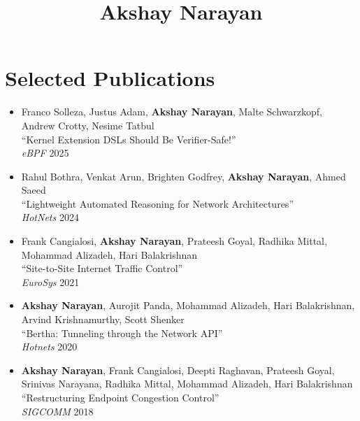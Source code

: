 \documentclass{article}
\newcommand{\preDoc}{}
\newcommand{\postDoc}{}
\newcommand{\titleAndEmptyVersionAndEmptyAuthors}[3]{\title{#1}\maketitle}
\newcommand{\identity}[1]{#1}
\begin{document}
\preDoc
\date{}
\titleAndEmptyVersionAndEmptyAuthors{Akshay Narayan}{}{}
\label{t:x28part_x22Akshayx5fNarayanx22x29}



\identity{\section{Selected Publications}}

\identity{\begin{itemize}[leftmargin=1cm]}
\identity{\item}Franco Solleza, Justus Adam, \identity{\textbf{Akshay Narayan}}, Malte Schwarzkopf, Andrew Crotty, Nesime Tatbul\identity{\\}{``}Kernel Extension DSLs Should Be Verifier{-}Safe!{''}\identity{\\}\identity{\emph{eBPF}}\identity{ }\identity{2025}\identity{\item}Rahul Bothra, Venkat Arun, Brighten Godfrey, \identity{\textbf{Akshay Narayan}}, Ahmed Saeed\identity{\\}{``}Lightweight Automated Reasoning for Network Architectures{''}\identity{\\}\identity{\emph{HotNets}}\identity{ }\identity{2024}\identity{\item}Frank Cangialosi, \identity{\textbf{Akshay Narayan}}, Prateesh Goyal, Radhika Mittal, Mohammad Alizadeh, Hari Balakrishnan\identity{\\}{``}Site{-}to{-}Site Internet Traffic Control{''}\identity{\\}\identity{\emph{EuroSys}}\identity{ }\identity{2021}\identity{\item}\identity{\textbf{Akshay Narayan}}, Aurojit Panda, Mohammad Alizadeh, Hari Balakrishnan, Arvind Krishnamurthy, Scott Shenker\identity{\\}{``}Bertha: Tunneling through the Network API{''}\identity{\\}\identity{\emph{Hotnets}}\identity{ }\identity{2020}\identity{\item}\identity{\textbf{Akshay Narayan}}, Frank Cangialosi, Deepti Raghavan, Prateesh Goyal, Srinivas Narayana, Radhika Mittal, Mohammad Alizadeh, Hari Balakrishnan\identity{\\}{``}Restructuring Endpoint Congestion Control{''}\identity{\\}\identity{\emph{SIGCOMM}}\identity{ }\identity{2018}
\identity{\end{itemize}}

\postDoc
\end{document}
